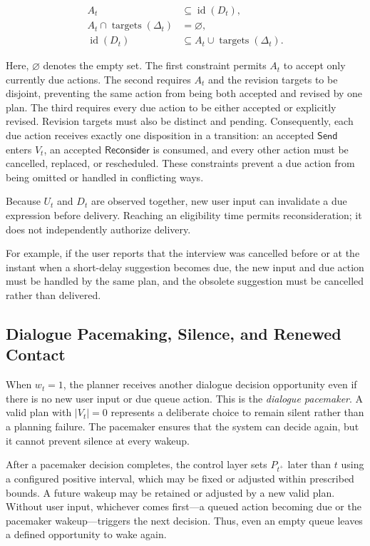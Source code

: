 \documentclass[manuscript,nonacm]{acmart}
\begin{document}
\begin{align}
A_t &\subseteq \operatorname{id}(D_t), \\
A_t \cap \operatorname{targets}(\Delta_t) &= \varnothing, \\
\operatorname{id}(D_t) &\subseteq A_t \cup \operatorname{targets}(\Delta_t).
\end{align}

Here, $\varnothing$ denotes the empty set. The first constraint permits $A_t$ to
accept only currently due actions. The second requires $A_t$ and the revision
targets to be disjoint, preventing the same action from being both accepted and
revised by one plan. The third requires every due action to be either accepted
or explicitly revised. Revision targets must also be distinct and pending.
Consequently, each due action receives exactly one disposition in a transition:
an accepted $\mathsf{Send}$ enters $V_t$, an accepted $\mathsf{Reconsider}$ is
consumed, and every other action must be cancelled, replaced, or rescheduled.
These constraints prevent a due action from being omitted or handled in
conflicting ways.

Because $U_t$ and $D_t$ are observed together, new user input can invalidate a
due expression before delivery. Reaching an eligibility time permits
reconsideration; it does not independently authorize delivery.

For example, if the user reports that the interview was cancelled before or at
the instant when a short-delay suggestion becomes due, the new input and due
action must be handled by the same plan, and the obsolete suggestion must be
cancelled rather than delivered.

\subsection{Dialogue Pacemaking, Silence, and Renewed Contact}

When $w_t=1$, the planner receives another dialogue decision opportunity even if
there is no new user input or due queue action. This is the \emph{dialogue
pacemaker}. A valid plan with $|V_t|=0$ represents a deliberate choice to
remain silent rather than a planning failure. The pacemaker ensures that the
system can decide again, but it cannot prevent silence at every wakeup.

After a pacemaker decision completes, the control layer sets $P_{t^+}$ later
than $t$ using a configured positive interval, which may be fixed or adjusted
within prescribed bounds. A future wakeup may be retained or adjusted by a new
valid plan. Without user input, whichever comes first---a queued action becoming
due or the pacemaker wakeup---triggers the next decision. Thus, even an empty
queue leaves a defined opportunity to wake again.
\end{document}
